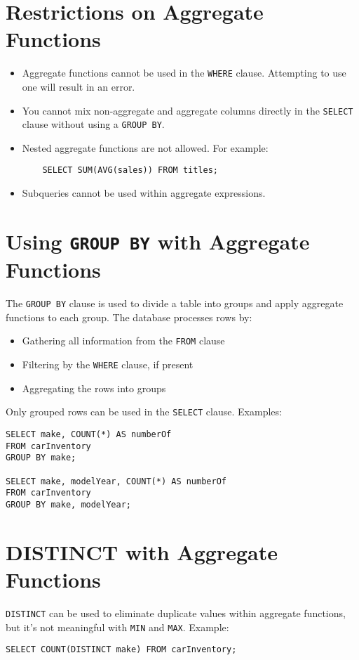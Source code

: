 \documentclass{article}
\begin{document}
\section{Restrictions on Aggregate Functions}
\begin{itemize}
    \item Aggregate functions cannot be used in the \texttt{WHERE} clause. Attempting to use one will result in an error.
    \item You cannot mix non-aggregate and aggregate columns directly in the \texttt{SELECT} clause without using a \texttt{GROUP BY}.
    \item Nested aggregate functions are not allowed. For example:
    \begin{verbatim}
    SELECT SUM(AVG(sales)) FROM titles;
    \end{verbatim}
    \item Subqueries cannot be used within aggregate expressions.
\end{itemize}

\section{Using \texttt{GROUP BY} with Aggregate Functions}
The \texttt{GROUP BY} clause is used to divide a table into groups and apply aggregate functions to each group. The database processes rows by:
\begin{itemize}
    \item Gathering all information from the \texttt{FROM} clause
    \item Filtering by the \texttt{WHERE} clause, if present
    \item Aggregating the rows into groups
\end{itemize}
Only grouped rows can be used in the \texttt{SELECT} clause. Examples:
\begin{verbatim}
SELECT make, COUNT(*) AS numberOf
FROM carInventory
GROUP BY make;

SELECT make, modelYear, COUNT(*) AS numberOf
FROM carInventory
GROUP BY make, modelYear;
\end{verbatim}

\section{DISTINCT with Aggregate Functions}
\texttt{DISTINCT} can be used to eliminate duplicate values within aggregate functions, but it’s not meaningful with \texttt{MIN} and \texttt{MAX}. Example:
\begin{verbatim}
SELECT COUNT(DISTINCT make) FROM carInventory;
\end{verbatim}
\end{document}
